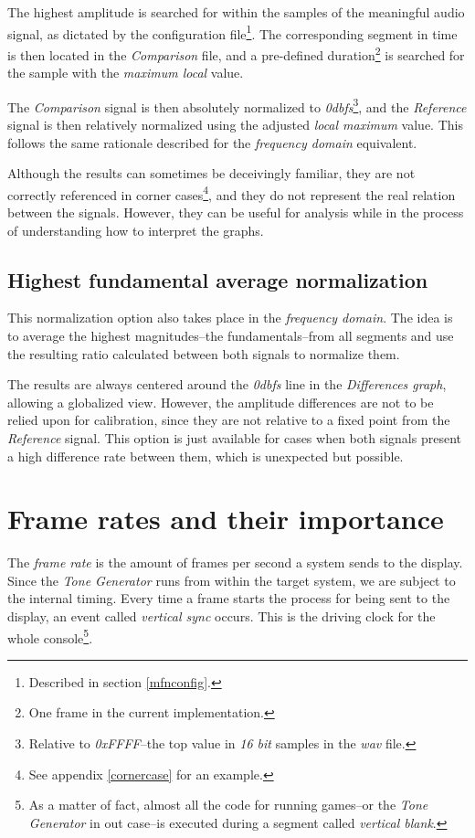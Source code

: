 \documentclass[10pt,a4paper]{report}
\newcommand{\ac}[1]{\textit{\acrshort{#1}}}
\newcommand{\db}[1]{\textit{#1\acrshort{dbfs}}}
\begin{document}
\begin{appendices}
The highest amplitude is searched for within the samples of the meaningful audio signal, as dictated by the configuration file\footnote{Described in section \ref{mfnconfig}.}. The corresponding segment in time is then located in the \textit{Comparison} file, and a pre-defined duration\footnote{One frame in the current implementation.} is searched for the sample with the \textit{maximum local} value.

The \textit{Comparison} signal is then absolutely normalized to \db{0}\footnote{Relative to \textit{0xFFFF}--the top value in \textit{16 bit} samples in the \ac{wav} file.}, and the \textit{Reference} signal is then relatively normalized using the adjusted \textit{local maximum} value. This follows the same rationale described for the \textit{frequency domain} equivalent.

Although the results can sometimes be deceivingly familiar, they are not correctly referenced in corner cases\footnote{See appendix \ref{cornercase} for an example.}, and they do not represent the real relation between the signals. However, they can be useful for analysis while in the process of understanding how to interpret the graphs.

\section{Highest fundamental average normalization}

This normalization option also takes place in the \textit{frequency domain}. The idea is to average the highest magnitudes--the fundamentals--from all segments and use the resulting ratio calculated between both signals to normalize them.

The results are always centered around the \db{0} line in the \textit{Differences graph}, allowing a globalized view. However, the amplitude differences are not to be relied upon for calibration, since they are not relative to a fixed point from the \textit{Reference} signal. This option is just available for cases when both signals present a high difference rate between them, which is unexpected but possible.

\chapter{Frame rates and their importance}
\label{framerate}

The \textit{frame rate} is the amount of frames per second a system sends to the display. Since the \textit{Tone Generator} runs from within the target system, we are subject to the internal timing. Every time a frame starts the process for being sent to the display, an event called \textit{vertical sync} occurs. This is the driving clock for the whole console\footnote{As a matter of fact, almost all the code for running games--or the \textit{Tone Generator} in out case--is executed during a segment called \textit{vertical blank}.}.


\end{appendices}
\end{document}
